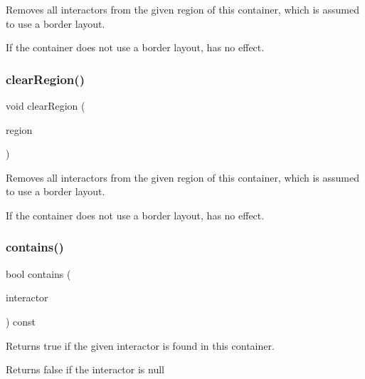 Removes all interactors from the given region of this container, which is assumed to use a border layout. 

If the container does not use a border layout, has no effect. \mbox{\label{classGContainer_aeba526cb4d6d6f3d8d6f376656af8dc8}} 
\subsubsection{\texorpdfstring{clear\+Region()}{clearRegion()}\hspace{0.1cm}{\footnotesize\ttfamily [2/2]}}
{\footnotesize\ttfamily void clear\+Region (\begin{DoxyParamCaption}\item[{const std\+::string \&}]{region }\end{DoxyParamCaption})\hspace{0.3cm}{\ttfamily [virtual]}}



Removes all interactors from the given region of this container, which is assumed to use a border layout. 

If the container does not use a border layout, has no effect. \mbox{\label{classGContainer_a29e67f98cd36414c67475b8941d861a6}} 
\subsubsection{\texorpdfstring{contains()}{contains()}\hspace{0.1cm}{\footnotesize\ttfamily [1/2]}}
{\footnotesize\ttfamily bool contains (\begin{DoxyParamCaption}\item[{\mbox{\hyperlink{classGInteractor}{G\+Interactor}} $\ast$}]{interactor }\end{DoxyParamCaption}) const\hspace{0.3cm}{\ttfamily [virtual]}}



Returns true if the given interactor is found in this container. 

Returns false if the interactor is null \mbox{\label{classGContainer_a62fe1c67f06f657fea8b9b28672516a0}} 

